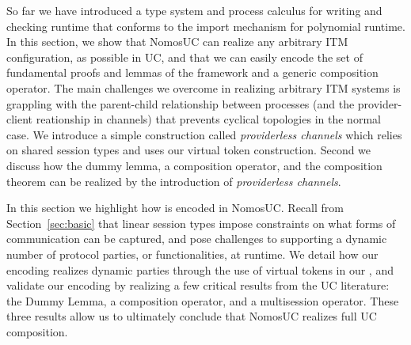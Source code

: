 So far we have introduced a type system and process calculus for writing and checking runtime that conforms to the import mechanism for polynomial runtime.
In this section, we show that NomosUC can realize any arbitrary ITM configuration, as possible in UC, and that we can easily encode the set of fundamental proofs and lemmas of the framework and a generic composition operator.
The main challenges we overcome in realizing arbitrary ITM systems is grappling with the parent-child relationship between processes (and the provider-client reationship in channels) that prevents cyclical topologies in the normal case. 
We introduce a simple construction called \emph{providerless channels} which relies on shared session types and uses our virtual token construction. 
Second we discuss how the dummy lemma, a composition operator, and the composition theorem can be realized by the introduction of \emph{providerless channels}.




In this section we highlight how  is encoded in NomosUC.
Recall from Section~\ref{sec:basic} that linear session types impose constraints on what forms of communication can be captured, and pose challenges to supporting 
a dynamic number of protocol parties, or functionalities, at runtime. 
We detail how our encoding realizes dynamic parties through the use of virtual tokens in our \partywrapper,
and validate our encoding by realizing a few critical results from the UC literature: the Dummy Lemma, a composition operator, and a multisession operator. 
These three results allow us to ultimately conclude that NomosUC realizes full UC composition.

